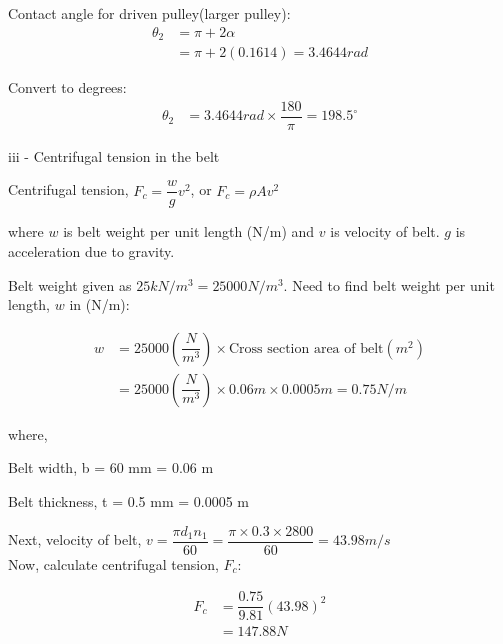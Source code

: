 \documentclass[a4paper, fleqn]{article}
\begin{document}
Contact angle for driven pulley(larger pulley):
\begin{equation*}
    \begin{aligned}
    \theta_2 &= \pi + 2\alpha\\
    &= \pi + 2(0.1614) = 3.4644 rad
    \end{aligned}
\end{equation*}

Convert to degrees:
\begin{equation*}
    \begin{aligned}
    \theta_2 &= 3.4644 rad \times \dfrac{180}{\pi} = 198.5^{\circ}
    \end{aligned}
\end{equation*}

iii - Centrifugal tension in the belt

Centrifugal tension, $F_c = \dfrac{w}{g} v^2$, or {$F_c = \rho A v^2$}

where $w$ is belt weight per unit length (N/m) and $v$ is velocity of belt. $g$ is acceleration due to gravity.

Belt weight given as $25 kN/m^3 = 25000 N/m^3$. Need to find belt weight per unit length, $w$ in (N/m): 

\begin{equation*}
    \begin{aligned}
    w &= 25000 \left(\dfrac{N}{m^3}\right) \times \text{Cross section area of belt} (m^2) \\
    &= 25000 \left(\dfrac{N}{m^3}\right) \times 0.06m \times 0.0005m = 0.75 N/m
    \end{aligned}
\end{equation*}

where,

Belt width, b = 60 mm = 0.06 m

Belt thickness, t = 0.5 mm = 0.0005 m

Next, velocity of belt, $v = \dfrac{\pi d_1 n_1}{60} = \dfrac{\pi \times 0.3 \times 2800}{60} = 43.98 m/s$\\

Now, calculate centrifugal tension, $F_c$:

\begin{equation*}
    \begin{aligned}
    F_c &= \dfrac{0.75}{9.81} (43.98)^2\\
    &= 147.88 N
    \end{aligned}
\end{equation*}
\end{document}
